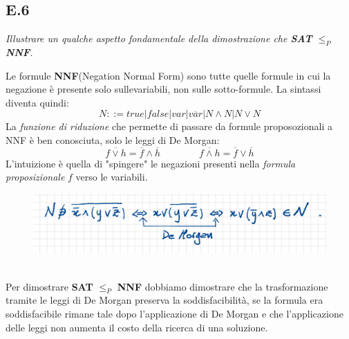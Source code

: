 \documentclass[a4paper]{article}
\begin{document}
\subsection{E.6}
\emph{Illustrare un qualche aspetto fondamentale della dimostrazione che \textbf{SAT} $\leq_P$ \textbf{NNF}.}


Le formule \textbf{NNF}(Negation Normal Form) sono tutte quelle formule in cui la negazione è presente solo sullevariabili, non sulle sotto-formule.
La sintassi diventa quindi:
$$ N ::= true|false|var|\overline{var}|N \land N|N \lor N$$
La \textit{funzione di riduzione} che permette di passare da formule proposozionali a NNF è ben conosciuta, solo le leggi di De Morgan:
$$ \overline{f \lor h} = \overline{f} \land \overline{h} \qquad \qquad \overline{f \land h} = \overline{f} \lor \overline{h}$$
L'intuizione è quella di "spingere" le negazioni presenti nella \textit{formula proposizionale} $f$ verso le variabili.\\
\begin{figure}[!ht]
                \centering
                \includegraphics[width = 1\textwidth]{./img/E6.png}
\end{figure}\\
Per dimostrare \textbf{SAT} $\leq_P$ \textbf{NNF} dobbiamo dimostrare che la trasformazione tramite le leggi di De Morgan preserva la soddisfacibilità, se la formula era soddisfacibile rimane tale dopo l'applicazione di De Morgan e che l'applicazione delle leggi non aumenta il costo della ricerca di una soluzione.
\end{document}
